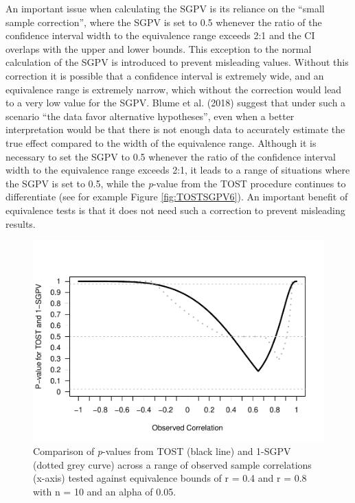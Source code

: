 \documentclass[,man,floatsintext]{apa6}
\begin{document}
An important issue when calculating the SGPV is its reliance on the
\enquote{small sample correction}, where the SGPV is set to 0.5 whenever
the ratio of the confidence interval width to the equivalence range
exceeds 2:1 and the CI overlaps with the upper and lower bounds. This
exception to the normal calculation of the SGPV is introduced to prevent
misleading values. Without this correction it is possible that a
confidence interval is extremely wide, and an equivalence range is
extremely narrow, which without the correction would lead to a very low
value for the SGPV. Blume et al. (2018) suggest that under such a
scenario \enquote{the data favor alternative hypotheses}, even when a
better interpretation would be that there is not enough data to
accurately estimate the true effect compared to the width of the
equivalence range. Although it is necessary to set the SGPV to 0.5
whenever the ratio of the confidence interval width to the equivalence
range exceeds 2:1, it leads to a range of situations where the SGPV is
set to 0.5, while the \emph{p}-value from the TOST procedure continues
to differentiate (see for example Figure \ref{fig:TOSTSGPV6}). An
important benefit of equivalence tests is that it does not need such a
correction to prevent misleading results.

\begin{figure}
\centering
\includegraphics{manuscript.R1_files/figure-latex/TOSTSGPV13-1.pdf}
\caption{\label{fig:TOSTSGPV13}Comparison of \emph{p}-values from TOST
(black line) and 1-SGPV (dotted grey curve) across a range of observed
sample correlations (x-axis) tested against equivalence bounds of r =
0.4 and r = 0.8 with n = 10 and an alpha of 0.05.}
\end{figure}
\end{document}
